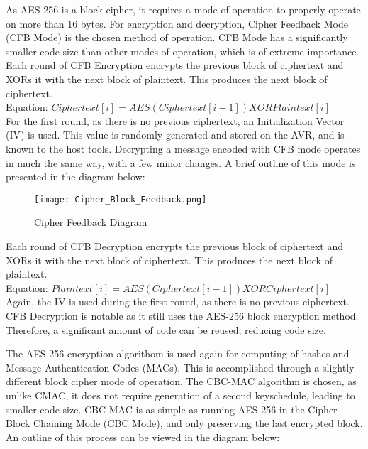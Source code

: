 \documentclass[11pt]{article}
\begin{document}
As AES-256 is a block cipher, it requires a mode of operation to properly operate on more than 16 bytes. For encryption and decryption, Cipher Feedback Mode (CFB Mode) is the chosen method of operation. CFB Mode has a significantly smaller code size than other modes of operation, which is of extreme importance.\\

Each round of CFB Encryption encrypts the previous block of ciphertext and XORs it with the next block of plaintext. This produces the next block of ciphertext.\\

Equation: $Ciphertext[i] = AES( Ciphertext[i - 1] ) XOR Plaintext[i]$\\

For the first round, as there is no previous ciphertext, an Initialization Vector (IV) is used. This value is randomly generated and stored on the AVR, and is known to the host tools.
Decrypting a message encoded with CFB mode operates in much the same way, with a few minor changes. A brief outline of this mode is presented in the diagram below:

\begin{figure}[!h]
\begin{center}
\texttt{[image: Cipher\_Block\_Feedback.png]}
\caption{Cipher Feedback Diagram}
\end{center}
\end{figure}

Each round of CFB Decryption encrypts the previous block of ciphertext and XORs it with the next block of ciphertext. This produces the next block of plaintext.\\

Equation: $Plaintext[i] = AES( Ciphertext[i - 1]) XOR Ciphertext[i]$\\

Again, the IV is used during the first round, as there is no previous ciphertext. CFB Decryption is notable as it still uses the AES-256 block encryption method. Therefore, a significant amount of code can be reused, reducing code size.

The AES-256 encryption algorithom is used again for computing of hashes and Message Authentication Codes (MACs). This is accomplished through a slightly different block cipher mode of operation. The CBC-MAC algorithm is chosen, as unlike CMAC, it does not require generation of a second keyschedule, leading to smaller code size. CBC-MAC is as simple as running AES-256 in the Cipher Block Chaining Mode (CBC Mode), and only preserving the last encrypted block. An outline of this process can be viewed in the diagram below:
\end{document}
